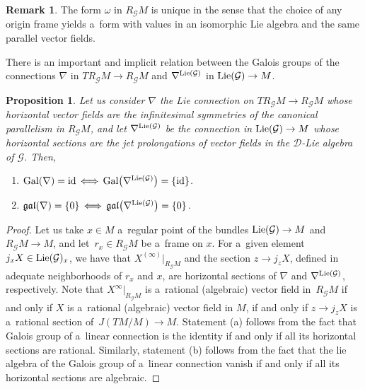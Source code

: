 \documentclass[pdftex]{sigma}
\numberwithin{equation}{section}
\newtheorem{Proposition}[Theorem]{Proposition}
\theoremstyle{definition}
\newtheorem{Remark}[Theorem]{Remark}
\begin{document}
\begin{Remark}
The form $\omega$ in $R_{\mathcal G}M$ is unique in the sense that the choice of any origin frame yields a~form with values in an isomorphic Lie algebra and the same parallel vector fields.
\end{Remark}

There is an important and implicit relation between the Galois groups of the connections $\nabla$ in $TR_\mathcal GM\to R_\mathcal GM$ and $\nabla^{{\rm Lie}(\mathcal G)}$ in ${\rm Lie}(\mathcal G)\to M$.

\begin{Proposition}\label{prp_Gal_Gal}
Let us consider $\nabla$ the Lie connection on $TR_\mathcal GM\to R_\mathcal GM$ whose horizontal vector fields are the infinitesimal symmetries of the canonical parallelism in $R_\mathcal GM$, and let $\nabla^{{\rm Lie}(\mathcal G)}$ be the connection in ${\rm Lie}(\mathcal G)\to M$ whose horizontal sections are the jet prolongations of vector fields in the $\mathcal D$-Lie algebra of $\mathcal G$. Then,
\begin{enumerate}\itemsep=0pt
 \item[$(a)$] ${\rm Gal}(\nabla) = {\rm id} \, \Longleftrightarrow \, {\rm Gal}\bigl(\nabla^{{\rm Lie}(\mathcal G)}\bigr) = \{\rm id\}$.
 \item[$(b)$] $\mathfrak{gal}(\nabla) = \{0\} \, \Longleftrightarrow \, \mathfrak{gal}\bigl(\nabla^{{\rm Lie}(\mathcal G)}\bigr) = \{\rm 0\}$.
\end{enumerate}
\end{Proposition}

\begin{proof}
Let us take $x\in M$ a~regular point of the bundles ${\rm Lie}(\mathcal G)\to M$ and $R_{\mathcal G}M\to M$, and let~${r_x \in R_{\mathcal G}M}$ be a~frame on $x$. For a~given element $j_xX\in {\rm Lie}(\mathcal G)_x$, we have that $X^{(\infty)}|_{R_\mathcal GM}$ and the section $z\to j_zX$, defined in adequate neighborhoods of $r_x$ and $x$, are horizontal sections of $\nabla$ and $\nabla^{{\rm Lie}(\mathcal G)}$, respectively. Note that $X^{\infty}|_{R_{\mathcal G}M}$ is a~rational (algebraic) vector field in~${R_\mathcal GM}$ if and only if $X$ is a~rational (algebraic) vector field in $M$, if and only if $z\to j_zX$ is a~rational section of~${J(TM/M)\to M}$. Statement (a) follows from the fact that Galois group of a~linear connection is the identity if and only if all its horizontal sections are rational. Similarly, statement (b) follows from the fact that the lie algebra of the Galois group of a~linear connection vanish if and only if all its horizontal sections are algebraic.
\end{proof}
\end{document}
